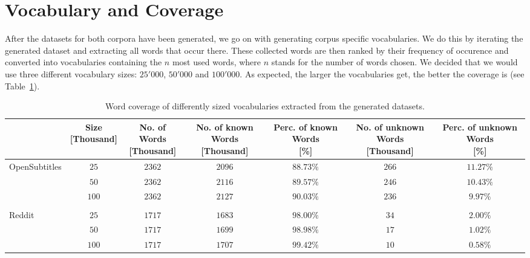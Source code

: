 \section{Vocabulary and Coverage}
\label{data:word_coverage}
After the datasets for both corpora have been generated, we go on with generating corpus specific vocabularies. We do this by iterating the generated dataset and extracting all words that occur there. These collected words are then ranked by their frequency of occurence and converted into vocabularies containing the $n$ most used words, where $n$ stands for the number of words chosen. We decided that we would use three different vocabulary sizes: $25'000$, $50'000$ and $100'000$. As expected, the larger the vocabularies get, the better the coverage is (see Table~\ref{tbl:data:split:corpus:analyze}).
\\
\begin{table}[H]
	\begin{adjustbox}{max width=\textwidth}
		\centering
		\small
		\begin{tabular}{lcccccc}
			\toprule
			&\specialcell{Size\\ {[Thousand]}}
			&\specialcell{No. of Words\\ {[Thousand]}}
			&\specialcell{No. of known Words\\ {[Thousand]}}
			&\specialcell{Perc. of known Words \\ {[\%]}}
			&\specialcell{No. of unknown Words \\ {[Thousand]}}
			&\specialcell{Perc. of unknown Words \\ {[\%]}}\\
			\midrule
			OpenSubtitles	&$25$		&$2362$	&$2096$	&$88.73\%$ &$266$	&$11.27\%$\\
							&$50$		&$2362$	&$2116$	&$89.57\%$	&$246$	&$10.43\%$\\
							&$100$	&$2362$	&$2127$	&$90.03\%$	&$236$	&$9.97\%$\\\\
			Reddit		&$25$		&$1717$	&$1683$	&$98.00\%$	&$34$		&$2.00\%$\\
						&$50$		&$1717$	&$1699$	&$98.98\%$	&$17$		&$1.02\%$\\
						&$100$	&$1717$	&$1707$	&$99.42\%$	&$10$		&$0.58\%$\\
			\bottomrule
		\end{tabular}
	\end{adjustbox}
	\caption{Word coverage of differently sized vocabularies extracted from the generated datasets.}
	\label{tbl:data:split:corpus:analyze}
\end{table}

